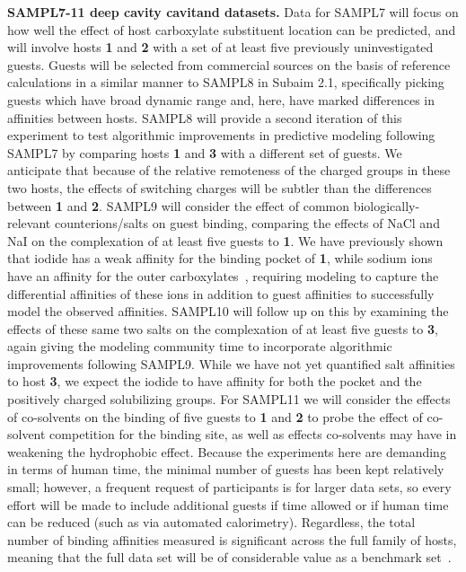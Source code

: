 \documentclass[11pt]{article}
\begin{document}
{\bf SAMPL7-11 deep cavity cavitand datasets.} 
Data for SAMPL7 will focus on how well the effect of host carboxylate substituent location can be predicted, and will involve hosts {\bf 1} and {\bf 2} with a set of at least five previously uninvestigated guests.  
Guests will be selected from commercial sources on the basis of reference calculations in a similar manner to SAMPL8 in Subaim 2.1, specifically picking guests which have broad dynamic range and, here, have marked differences in affinities between hosts.
SAMPL8 will provide a second iteration of this experiment to test algorithmic improvements in predictive modeling following SAMPL7 by comparing hosts {\bf 1} and {\bf 3} with a different set of guests.  
We anticipate that because of the relative remoteness of the charged groups in these two hosts, the effects of switching charges will be subtler than the differences between {\bf 1} and {\bf 2}.  
SAMPL9 will consider the effect of common biologically-relevant counterions/salts on guest binding, comparing the effects of NaCl and NaI on the complexation of at least five guests to {\bf 1}.  
We have previously shown that iodide has a weak affinity for the binding pocket of {\bf 1}, while sodium ions have an affinity for the outer carboxylates~\cite{carnegie_anion_2014}, requiring modeling to capture the differential affinities of these ions in addition to guest affinities to successfully model the observed affinities.  
SAMPL10 will follow up on this by examining the effects of these same two salts on the complexation of at least five guests to {\bf 3}, again giving the modeling community time to incorporate algorithmic improvements following SAMPL9. 
While we have not yet quantified salt affinities to host {\bf 3}, we expect the iodide to have affinity for both the pocket and the positively charged solubilizing groups.  
For SAMPL11 we will consider the effects of co-solvents on the binding of five guests to {\bf 1} and {\bf 2} to probe the effect of co-solvent competition for the binding site, as well as effects co-solvents may have in weakening the hydrophobic effect. 
Because the experiments here are demanding in terms of human time, the minimal number of guests has been kept relatively small; however, a frequent request of participants is for larger data sets, so every effort will be made to include additional guests if time allowed or if human time can be reduced (such as via automated calorimetry).
Regardless, the total number of binding affinities measured is significant across the full family of hosts, meaning that the full data set will be of considerable value as a benchmark set~\cite{Mobley:2017:AnnualReviewofBiophysics}. 
\end{document}
